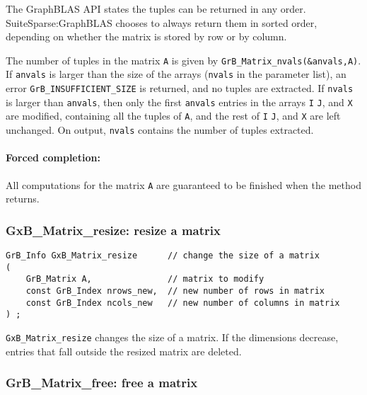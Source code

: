\documentclass[12pt]{article}
\begin{document}
The GraphBLAS API states the tuples can be returned in any order.
SuiteSparse:GraphBLAS chooses to always return them in sorted order, depending
on whether the matrix is stored by row or by column.

The number of tuples in the matrix \verb'A' is given by
\verb'GrB_Matrix_nvals(&anvals,A)'.  If \verb'anvals' is larger than the size
of the arrays (\verb'nvals' in the parameter list), an error
\verb'GrB_INSUFFICIENT_SIZE' is returned, and no tuples are extracted.  If
\verb'nvals' is larger than \verb'anvals', then only the first \verb'anvals'
entries in the arrays \verb'I' \verb'J', and \verb'X' are modified, containing
all the tuples of \verb'A', and the rest of \verb'I' \verb'J', and \verb'X' are
left unchanged.  On output, \verb'nvals' contains the number of tuples
extracted.

\paragraph{Forced completion:}
All computations for the matrix \verb'A' are
guaranteed to be finished when the method returns.

\subsubsection{{\sf GxB\_Matrix\_resize:}          resize a matrix}
\label{matrix_resize}

\begin{mdframed}[userdefinedwidth=6in]
{\footnotesize
\begin{verbatim}
GrB_Info GxB_Matrix_resize      // change the size of a matrix
(
    GrB_Matrix A,               // matrix to modify
    const GrB_Index nrows_new,  // new number of rows in matrix
    const GrB_Index ncols_new   // new number of columns in matrix
) ;
\end{verbatim} } \end{mdframed}

\verb'GxB_Matrix_resize' changes the size of a matrix.
If the dimensions decrease, entries that fall outside the resized
matrix are deleted.

\subsubsection{{\sf GrB\_Matrix\_free:} free a matrix}
\label{matrix_free}
\end{document}
